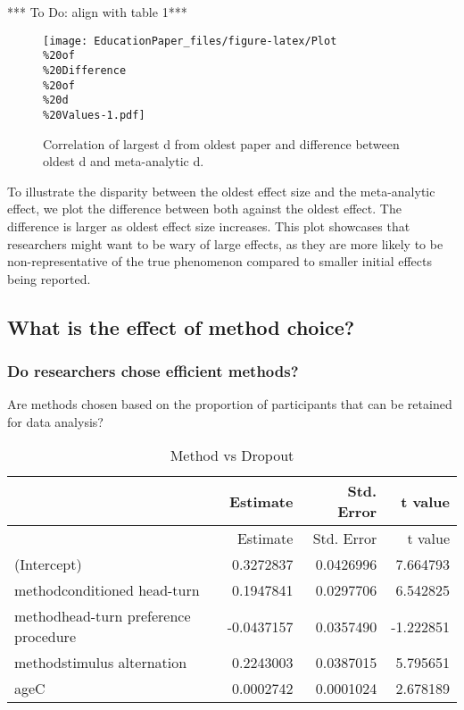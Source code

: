 \documentclass[english,floatsintext,man]{apa6}
\begin{document}
*** To Do: align with table 1***

\begin{figure}[htbp]
\centering
\texttt{[image: EducationPaper\_files/figure-latex/Plot\\\%20of\\\%20Difference\\\%20of\\\%20d\\\%20Values-1.pdf]}
\caption{Correlation of largest d from oldest paper and difference
between oldest d and meta-analytic d.}
\end{figure}

To illustrate the disparity between the oldest effect size and the
meta-analytic effect, we plot the difference between both against the
oldest effect. The difference is larger as oldest effect size increases.
This plot showcases that researchers might want to be wary of large
effects, as they are more likely to be non-representative of the true
phenomenon compared to smaller initial effects being reported.

\subsection{What is the effect of method
choice?}\label{what-is-the-effect-of-method-choice}

\subsubsection{Do researchers chose efficient
methods?}\label{do-researchers-chose-efficient-methods}

Are methods chosen based on the proportion of participants that can be
retained for data analysis?

\begin{longtable}[]{@{}lrrr@{}}
\caption{Method vs Dropout}\tabularnewline
\toprule
& Estimate & Std. Error & t value\tabularnewline
\midrule
\endfirsthead
\toprule
& Estimate & Std. Error & t value\tabularnewline
\midrule
\endhead
(Intercept) & 0.3272837 & 0.0426996 & 7.664793\tabularnewline
methodconditioned head-turn & 0.1947841 & 0.0297706 &
6.542825\tabularnewline
methodhead-turn preference procedure & -0.0437157 & 0.0357490 &
-1.222851\tabularnewline
methodstimulus alternation & 0.2243003 & 0.0387015 &
5.795651\tabularnewline
ageC & 0.0002742 & 0.0001024 & 2.678189\tabularnewline
\bottomrule
\end{longtable}
\end{document}
